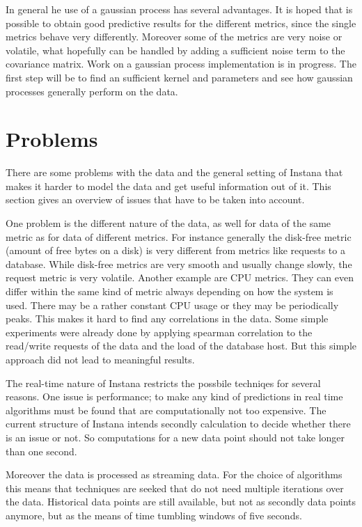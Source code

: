 \documentclass[]{article}
\begin{document}
In general he use of a gaussian process has several advantages.
It is hoped that is possible to obtain good predictive results for the different metrics, since the single metrics behave very differently.
Moreover some of the metrics are very noise or volatile, what hopefully can be handled by adding a sufficient noise term to the covariance matrix.
Work on a gaussian process implementation is in progress. 
The first step will be to find an sufficient kernel and parameters and see how  gaussian processes generally perform on the data.

\section{Problems}
There are some problems with the data and the general setting of Instana that makes it harder to model the data and get useful information out of it.
This section gives an overview of issues that have to be taken into account.

One problem is the different nature of the data, as well for data of the same metric as for data of different metrics.
For instance generally the disk-free metric (amount of free bytes on a disk) is very different from metrics like requests to a database.
While disk-free metrics are very smooth and usually change slowly, the request metric is very volatile.
Another example are CPU metrics.
They can even differ within the same kind of metric always depending on how the system is used.
There may be a rather constant CPU usage or they may be periodically peaks.
This makes it hard to find any correlations in the data.
Some simple experiments were already done by applying spearman correlation to the read/write requests of the data and the load of the database host.
But this simple approach did not lead to meaningful results.

The real-time nature of Instana restricts the possbile techniqes for several reasons.
One issue is performance; to make any kind of predictions in real time algorithms must be found that are computationally not too expensive.
The current structure of Instana intends secondly calculation to decide whether there is an issue or not.
So computations for a new data point should not take longer than one second.

Moreover the data is processed as streaming data.
For the choice of algorithms this means that techniques are seeked that do not need multiple iterations over the data.
Historical data points are still available, but not as secondly data points anymore, but as the means of time tumbling windows of five seconds. 
\end{document}

